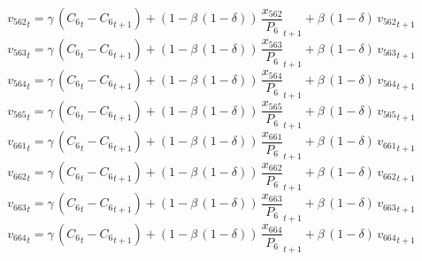\begin{dmath}
{{v_{562}}}_{t}={{\gamma}}\, \left({{C_{6}}}_{t}-{{C_{6}}}_{t+1}\right)+\left(1-{{\beta}}\, \left(1-{{\delta}}\right)\right)\, {{\frac{x_{562}}{P_{6}}}}_{t+1}+{{\beta}}\, \left(1-{{\delta}}\right)\, {{v_{562}}}_{t+1}
\end{dmath}
\begin{dmath}
{{v_{563}}}_{t}={{\gamma}}\, \left({{C_{6}}}_{t}-{{C_{6}}}_{t+1}\right)+\left(1-{{\beta}}\, \left(1-{{\delta}}\right)\right)\, {{\frac{x_{563}}{P_{6}}}}_{t+1}+{{\beta}}\, \left(1-{{\delta}}\right)\, {{v_{563}}}_{t+1}
\end{dmath}
\begin{dmath}
{{v_{564}}}_{t}={{\gamma}}\, \left({{C_{6}}}_{t}-{{C_{6}}}_{t+1}\right)+\left(1-{{\beta}}\, \left(1-{{\delta}}\right)\right)\, {{\frac{x_{564}}{P_{6}}}}_{t+1}+{{\beta}}\, \left(1-{{\delta}}\right)\, {{v_{564}}}_{t+1}
\end{dmath}
\begin{dmath}
{{v_{565}}}_{t}={{\gamma}}\, \left({{C_{6}}}_{t}-{{C_{6}}}_{t+1}\right)+\left(1-{{\beta}}\, \left(1-{{\delta}}\right)\right)\, {{\frac{x_{565}}{P_{6}}}}_{t+1}+{{\beta}}\, \left(1-{{\delta}}\right)\, {{v_{565}}}_{t+1}
\end{dmath}
\begin{dmath}
{{v_{661}}}_{t}={{\gamma}}\, \left({{C_{6}}}_{t}-{{C_{6}}}_{t+1}\right)+\left(1-{{\beta}}\, \left(1-{{\delta}}\right)\right)\, {{\frac{x_{661}}{P_{6}}}}_{t+1}+{{\beta}}\, \left(1-{{\delta}}\right)\, {{v_{661}}}_{t+1}
\end{dmath}
\begin{dmath}
{{v_{662}}}_{t}={{\gamma}}\, \left({{C_{6}}}_{t}-{{C_{6}}}_{t+1}\right)+\left(1-{{\beta}}\, \left(1-{{\delta}}\right)\right)\, {{\frac{x_{662}}{P_{6}}}}_{t+1}+{{\beta}}\, \left(1-{{\delta}}\right)\, {{v_{662}}}_{t+1}
\end{dmath}
\begin{dmath}
{{v_{663}}}_{t}={{\gamma}}\, \left({{C_{6}}}_{t}-{{C_{6}}}_{t+1}\right)+\left(1-{{\beta}}\, \left(1-{{\delta}}\right)\right)\, {{\frac{x_{663}}{P_{6}}}}_{t+1}+{{\beta}}\, \left(1-{{\delta}}\right)\, {{v_{663}}}_{t+1}
\end{dmath}
\begin{dmath}
{{v_{664}}}_{t}={{\gamma}}\, \left({{C_{6}}}_{t}-{{C_{6}}}_{t+1}\right)+\left(1-{{\beta}}\, \left(1-{{\delta}}\right)\right)\, {{\frac{x_{664}}{P_{6}}}}_{t+1}+{{\beta}}\, \left(1-{{\delta}}\right)\, {{v_{664}}}_{t+1}
\end{dmath}
